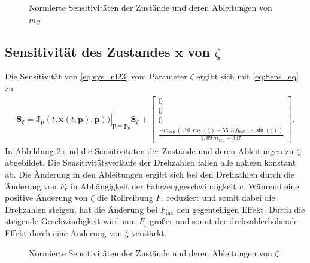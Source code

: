 \begin{figure}
\centering
\newlength\mheight 
\setlength\mheight{8cm}
\newlength\mwidth 
\setlength\mwidth{13cm}

\caption{Normierte Sensitivitäten der Zustände und deren Ableitungen von $m_\mathrm{C}$}
\label{fig:Sens_m}
\end{figure}

\subsection{Sensitivität des Zustandes $\pmb{x}$ von $\zeta$}
Die Sensitivität von \eqref{eq:sys_nl23} vom Parameter $\zeta$ ergibt sich mit \eqref{eq:Sens_eq} zu
\begin{align}
\dot{\pmb{S}}_{\zeta} = \left. \pmb{J}_\mathrm{p}(t,\pmb{x}(t,\pmb{p}),\pmb{p}))\right|_{\pmb{p}=\pmb{p}_0} \pmb{S}_{\zeta}
+ \begin{bmatrix} 0 \\ 0 \\ 0 \\ \frac{-m_\mathrm{veh}\,(170\,\cos(\zeta) - 55,8\,f_\mathrm{Roll}\,\omega_\mathrm{C}\,\sin(\zeta))}{5,69\,m_\mathrm{veh} + 337}\end{bmatrix}.
\end{align}
In Abbildung \ref{fig:Sens_z} sind die Sensitivitäten der Zustände und deren Ableitungen zu $\zeta$ abgebildet. Die Sensitivitätsverläufe der Drehzahlen fallen alle nahezu konstant ab. Die Änderung in den Ableitungen ergibt sich bei den Drehzahlen durch die Änderung von $F_\mathrm{r}$ in Abhängigkeit der Fahrzeuggeschwindigkeit $v$. Während eine positive Änderung von $\zeta$ die Rollreibung $F_\mathrm{r}$ reduziert und somit dabei die Drehzahlen steigen, hat die Änderung bei $F_\mathrm{inc}$ den gegenteiligen Effekt. Durch die steigende Geschwindigkeit wird nun $F_\mathrm{r}$ größer und somit der drehzahlerhöhende Effekt durch eine Änderung von $\zeta$ verstärkt.
 
\begin{figure}
\centering
\newlength\zheight 
\setlength\zheight{8cm}
\newlength\zwidth 
\setlength\zwidth{13cm}

\caption{Normierte Sensitivitäten der Zustände und deren Ableitungen von $\zeta$}
\label{fig:Sens_z}
\end{figure}



